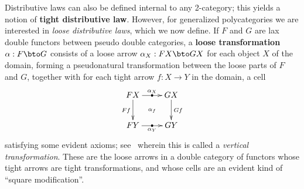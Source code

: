 \documentclass{amsart}
\begin{document}
Distributive laws can also be defined internal to any 2-category; this yields a notion of \textbf{tight distributive law}.
However, for generalized polycategories we are interested in \emph{loose distributive laws}, which we now define.
If $F$ and $G$ are lax double functors between pseudo double categories, a \textbf{loose transformation} $\alpha:F\bto G$ consists of a loose arrow $\alpha_X : F X \bto G X$ for each object $X$ of the domain, forming a pseudonatural transformation between the loose parts of $F$ and $G$, together with for each tight arrow $f:X\to Y$ in the domain, a cell
\[ \xymatrix{ F X \ar[r]|-{\bullet}^-{\alpha_X} \ar[d]_{F f} \ar@{}[dr]|{\alpha_f} & G X \ar[d]^{G f} \\
F Y \ar[r]|-{\bullet}_-{\alpha_Y} & G Y} \]
satisfying some evident axioms; see~\cite{gp:something} wherein this is called a \emph{vertical transformation}.
These are the loose arrows in a double category of functors whose tight arrows are tight transformations, and whose cells are an evident kind of ``square modification''.
\end{document}

